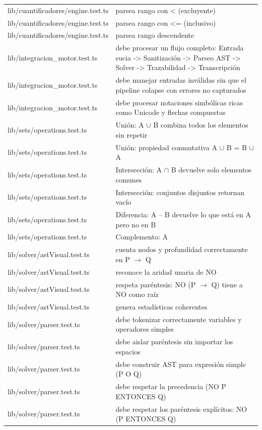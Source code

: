 \documentclass[11pt,a4paper,openany]{book}
\begin{document}
\begin{center}
\begin{longtable}{ll}
lib/cuantificadores/engine.test.ts & parsea rango con < (excluyente) \\
lib/cuantificadores/engine.test.ts & parsea rango con <= (inclusivo) \\
lib/cuantificadores/engine.test.ts & parsea rango descendente \\
lib/integracion\_motor.test.ts & debe procesar un flujo completo: Entrada sucia -> Sanitización -> Parseo AST -> Solver -> Trazabilidad -> Transcripción \\
lib/integracion\_motor.test.ts & debe manejar entradas inválidas sin que el pipeline colapse con errores no capturados \\
lib/integracion\_motor.test.ts & debe procesar notaciones simbólicas ricas como Unicode y flechas compuestas \\
lib/sets/operations.test.ts & Unión: A $ \cup $ B combina todos los elementos sin repetir \\
lib/sets/operations.test.ts & Unión: propiedad conmutativa A $ \cup $ B = B $ \cup $ A \\
lib/sets/operations.test.ts & Intersección: A $ \cap $ B devuelve solo elementos comunes \\
lib/sets/operations.test.ts & Intersección: conjuntos disjuntos retornan vacío \\
lib/sets/operations.test.ts & Diferencia: A -- B devuelve lo que está en A pero no en B \\
lib/sets/operations.test.ts & Complemento: A\ \\
lib/solver/astVisual.test.ts & cuenta nodos y profundidad correctamente en P $ \to $ Q \\
lib/solver/astVisual.test.ts & reconoce la aridad unaria de NO \\
lib/solver/astVisual.test.ts & respeta paréntesis: NO (P $ \to $ Q) tiene a NO como raíz \\
lib/solver/astVisual.test.ts & genera estadísticas coherentes \\
lib/solver/parser.test.ts & debe tokenizar correctamente variables y operadores simples \\
lib/solver/parser.test.ts & debe aislar paréntesis sin importar los espacios \\
lib/solver/parser.test.ts & debe construir AST para expresión simple (P O Q) \\
lib/solver/parser.test.ts & debe respetar la precedencia (NO P ENTONCES Q) \\
lib/solver/parser.test.ts & debe respetar los paréntesis explícitos: NO (P ENTONCES Q) \\

\end{longtable}
\end{center}
\end{document}
